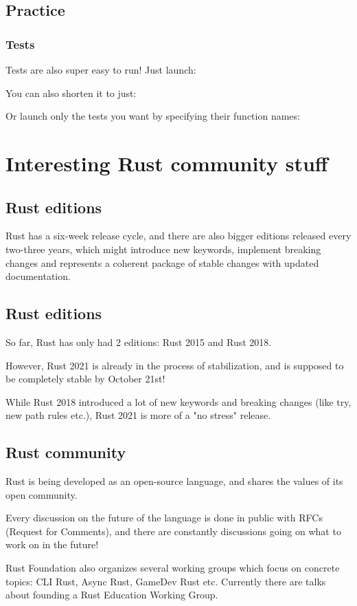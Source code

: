 \documentclass[usenames,twocolumn,dvipsnames,10pt,a4wide]{article}
\begin{document}
	\inputminted[fontsize=\normalsize]{rust}{code/list12.rs}
	


\subsection{Practice}
	\subsubsection{Tests}
	\large
	Tests are also super easy to run! Just launch:
	
	You can also shorten it to just: 
	
Or launch only the tests you want
by specifying their function names: 
	



\section{Interesting Rust community stuff}

\subsection{Rust editions}
	\Large
	Rust has a six-week release cycle, and there are also
	bigger editions released every two-three years, which
	might introduce new keywords, implement breaking
	changes	and represents a coherent package of stable
	changes with updated documentation.



\subsection{Rust editions}
	\large
	So far, Rust has only had 2 editions: Rust 2015 and Rust 2018.

	
	
	However, Rust 2021 is already in the process of stabilization,
	and is supposed to be completely stable by October 21st!

	
	
	While Rust 2018 introduced a lot of new keywords and breaking
	changes (like try, 
	new path rules etc.), Rust 2021
	is more of a "no stress" release.


\subsection{Rust community}
	\large
	Rust is being developed as an open-source language, and
	shares the values of its open community.

	
	Every discussion on the future of the language is done
	in public with RFCs (Request for Comments), and there
	are constantly discussions going on what to work on in
	the future!

	
	Rust Foundation also organizes several working groups
	which focus on concrete topics: CLI Rust, Async Rust,
	GameDev Rust etc. Currently there are talks about
	founding a Rust Education Working Group.
\end{document}
